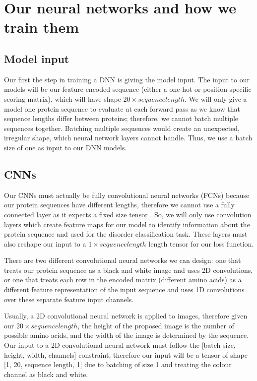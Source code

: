 \documentclass{l4proj}
\begin{document}
\section{Our neural networks and how we train them}

\subsection{Model input}

Our first the step in training a DNN is giving the model input. The input to our models will be our feature encoded sequence (either a one-hot or position-specific scoring matrix), which will have shape $20\times sequence length$. We will only give a model one protein sequence to evaluate at each forward pass as we know that sequence lengths differ between proteins; therefore, we cannot batch multiple sequences together. Batching multiple sequences would create an unexpected, irregular shape, which neural network layers cannot handle. Thus, we use a batch size of one as input to our DNN models.

\subsection{CNNs}

Our CNNs must actually be fully convolutional neural networks (FCNs) because our protein sequences have different lengths, therefore we cannot use a fully connected layer as it expects a fixed size tensor \citep{fcn_seg}. So, we will only use convolution layers which create feature maps for our model to identify information about the protein sequence and used for the disorder classification task. These layers must also reshape our input to a $1\times sequence length$ length tensor for our loss function.

There are two different convolutional neural networks we can design: one that treats our protein sequence as a black and white image and uses 2D convolutions, or one that treats each row in the encoded matrix (different amino acids) as a different feature representation of the input sequence and uses 1D convolutions over these separate feature input channels. 

Usually, a 2D convolutional neural network is applied to images, therefore given our $20\times sequence length$, the height of the proposed image is the number of possible amino acids, and the width of the image is determined by the sequence. Our input to a 2D convolutional neural network must follow the [batch size, height, width, channels] constraint, therefore our input will be a tensor of shape [1, 20, sequence length, 1] due to batching of size 1 and treating the colour channel as black and white. 
\end{document}
